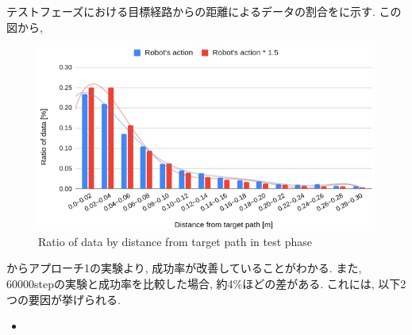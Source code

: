\begin{itemize}
  \newpage

  テストフェーズにおける目標経路からの距離によるデータの割合をに示す. この図から, 

  \begin{figure}[hbtp]
    \centering
   \includegraphics[keepaspectratio, scale=0.55]
        {images/hist_act_test.png}
   \caption{Ratio of data by distance from target path in test phase}
   \label{Fig:hist_act_test}
  \end{figure}  

  \newpage

  からアプローチ1の実験より, 成功率が改善していることがわかる. また, 60000stepの実験と成功率を比較した場合, 約4\%ほどの差がある. これには, 以下2つの要因が挙げられる.
  \begin{itemize}
    \item 
  \end{itemize}

\end{itemize}


\newpage
